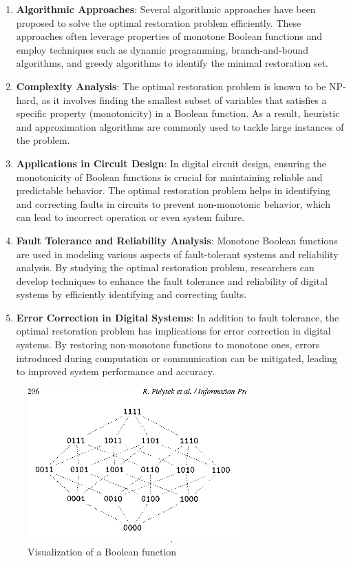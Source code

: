 \documentclass{article}
\renewcommand{\_}{\ifincsname_\else\legacyunderscore\fi}
\begin{document}
\begin{enumerate}
    \item \textbf{Algorithmic Approaches}: Several algorithmic approaches have been proposed to solve the optimal restoration problem efficiently. These approaches often leverage properties of monotone Boolean functions and employ techniques such as dynamic programming, branch-and-bound algorithms, and greedy algorithms to identify the minimal restoration set.
    
    \item \textbf{Complexity Analysis}: The optimal restoration problem is known to be NP-hard, as it involves finding the smallest subset of variables that satisfies a specific property (monotonicity) in a Boolean function. As a result, heuristic and approximation algorithms are commonly used to tackle large instances of the problem.
    
    \item \textbf{Applications in Circuit Design}: In digital circuit design, ensuring the monotonicity of Boolean functions is crucial for maintaining reliable and predictable behavior. The optimal restoration problem helps in identifying and correcting faults in circuits to prevent non-monotonic behavior, which can lead to incorrect operation or even system failure.
    
    \item \textbf{Fault Tolerance and Reliability Analysis}: Monotone Boolean functions are used in modeling various aspects of fault-tolerant systems and reliability analysis. By studying the optimal restoration problem, researchers can develop techniques to enhance the fault tolerance and reliability of digital systems by efficiently identifying and correcting faults.
    
    \item \textbf{Error Correction in Digital Systems}: In addition to fault tolerance, the optimal restoration problem has implications for error correction in digital systems. By restoring non-monotone functions to monotone ones, errors introduced during computation or communication can be mitigated, leading to improved system performance and accuracy.
\end{enumerate}
\begin{figure}[h]
    \centering
    \includegraphics[width=0.75\textwidth]{Monotone_Boolean_functions}
    \caption{Visualization of a Boolean function}
    \label{fig:dimensionality_reduction}
\end{figure}
\newpage
\end{document}
